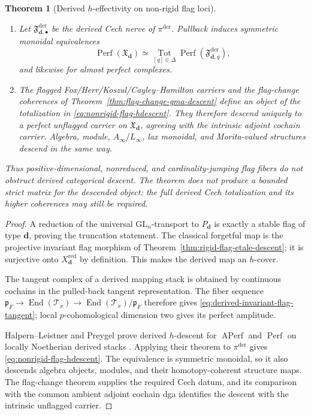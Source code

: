 \documentclass[11pt]{article}
\newtheorem{theorem}{Theorem}[section]
\theoremstyle{definition}
\begin{document}
\begin{theorem}[Derived $h$-effectivity on non-rigid flag loci]
\begin{enumerate}[label=\textnormal{(\roman*)}]
\item Let $\mathfrak F^{\mathrm{der}}_{\mathbf d,\bullet}$ be the
derived Cech nerve of $\pi^{\mathrm{der}}$.  Pullback induces symmetric
monoidal equivalences
\begin{equation}\label{eq:nonrigid-flag-hdescent}
 \operatorname{Perf}(\mathfrak X_{\mathbf d})
 \simeq
 \operatorname*{Tot}_{[q]\in\Delta}
 \operatorname{Perf}
 \left(\mathfrak F^{\mathrm{der}}_{\mathbf d,q}\right),
\end{equation}
and likewise for almost perfect complexes.

\item The flagged Fox/Herr/Koszul/Cayley--Hamilton carriers and the
flag-change coherences of Theorem~\ref{thm:flag-change-gma-descent} define an
object of the totalization in
\eqref{eq:nonrigid-flag-hdescent}.  They therefore descend uniquely to a
perfect unflagged carrier on $\mathfrak X_{\mathbf d}$, agreeing with the
intrinsic adjoint cochain carrier.  Algebra, module, $A_\infty/L_\infty$,
lax monoidal, and Morita-valued structures descend in the same way.
\end{enumerate}

Thus positive-dimensional, nonreduced, and cardinality-jumping flag fibers do
not obstruct derived categorical descent.  The theorem does not produce a
bounded strict matrix for the descended object: the full derived Cech
totalization and its higher coherences may still be required.
\end{theorem}

\begin{proof}
A reduction of the universal $\mathrm{GL}_n$-transport to
$P_{\mathbf d}$ is exactly a stable flag of type $\mathbf d$, proving the
truncation statement.  The classical forgetful map is the projective invariant
flag morphism of Theorem~\ref{thm:rigid-flag-etale-descent}; it is surjective
onto $X_{\mathbf d}^{\mathrm{red}}$ by definition.  This makes the derived
map an $h$-cover.

The tangent complex of a derived mapping stack is obtained by continuous
cochains in the pulled-back tangent representation.  The fiber sequence
$\mathfrak p_F\to\operatorname{End}(\mathcal T_x)\to
\operatorname{End}(\mathcal T_x)/\mathfrak p_F$ therefore gives
\eqref{eq:derived-invariant-flag-tangent}; local $p$-cohomological dimension
two gives its perfect amplitude.

Halpern--Leistner and Preygel prove derived $h$-descent for
$\operatorname{APerf}$ and $\operatorname{Perf}$ on locally Noetherian
derived stacks \cite[Theorem~3.3.1]{HalpernLeistnerPreygel}.  Applying their
theorem to $\pi^{\mathrm{der}}$ gives
\eqref{eq:nonrigid-flag-hdescent}.  The equivalence is symmetric monoidal, so
it also descends algebra objects, modules, and their homotopy-coherent
structure maps.  The flag-change theorem supplies the required Cech datum,
and its comparison with the common ambient adjoint cochain dga identifies the
descent with the intrinsic unflagged carrier.
\end{proof}
\end{document}
